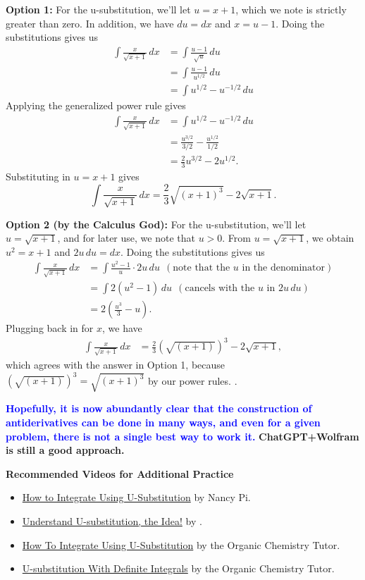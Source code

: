 \textbf{Option 1:} For the u-substitution, we'll let $u = x+1$, which we note is strictly greater than zero. In addition, we have $du = dx$ and $x = u - 1$. Doing the substitutions gives us
\begin{align*}
    \int \frac{x}{\sqrt{x+1}} \, dx &= \int \frac{u-1}{\sqrt{u}} \, du \\
    & =  \int \frac{u-1}{u^{1/2}} \, du \\
    &= \int u^{1/2} - u^{-1/2}\, du 
\end{align*}
Applying the generalized power rule gives 
\begin{align*}
    \int \frac{x}{\sqrt{x+1}} \, dx &=  \int u^{1/2} - u^{-1/2}\, du \\
    & =  \frac{u^{3/2}}{3/2} - \frac{u^{1/2}}{1/2} \\
    &=  \frac{2}{3} u^{3/2} - 2 u^{1/2}.
\end{align*}
Substituting in $u=x+1$ gives 
$$\int \frac{x}{\sqrt{x+1}} \, dx =  \frac{2}{3} \sqrt{(x+1)^3} - 2 \sqrt{x + 1}. $$

\textbf{Option 2 (by the Calculus God):}  For the u-substitution, we'll let $u = \sqrt{x+1}$, and for later use, we note that $u>0$. From $u = \sqrt{x+1}$, we obtain $u^2 = x + 1$ and $2 u \, du = dx$. Doing the substitutions gives us
\begin{align*}
    \int \frac{x}{\sqrt{x+1}} \, dx &=  \int   \frac{u^2-1}{u} \cdot 2u\, du ~~(\text{note that the $u$ in the denominator})\\
    & = \int  2 \left( u^2 - 1\right)\, du  ~~(\text{cancels with the $u$ in $2u \, du$})\\
    &=  2 \left( \frac{u^3}{3} - u \right).
\end{align*}
Plugging back in for $x$, we have 
\begin{align*} 
\int \frac{x}{\sqrt{x+1}} \, dx &= \frac{2}{3} \left(\sqrt{(x+1)}\right)^3 - 2 \sqrt{x + 1},
\end{align*}
which agrees with the answer in Option 1, because $ \left(\sqrt{(x+1)}\right)^3  = \sqrt{(x+1)^3}$ by our power rules.
\Qed.


\bigskip

\textcolor{blue}{\bf Hopefully, it is now abundantly clear that the construction of antiderivatives can be done in many ways, and even for a given problem, there is not a single best way to work it.} \textbf{ChatGPT+Wolfram is still a good approach.} 

\bigskip
\textbf{Recommended Videos for Additional Practice}
\begin{itemize}
    \item \href{https://youtu.be/8B31SAk1nD8}{How to Integrate Using U-Substitution} by Nancy Pi.
    \item \href{https://youtu.be/3eWxzBbsS9o}{Understand U-substitution, the Idea!} by \bprp.
    \item \href{https://youtu.be/sdYdnpYn-1o}{How To Integrate Using U-Substitution} by the Organic Chemistry Tutor.
    \item \href{https://youtu.be/tM4RWc9ryx0}{U-substitution With Definite Integrals} by the Organic Chemistry Tutor.
\end{itemize}


